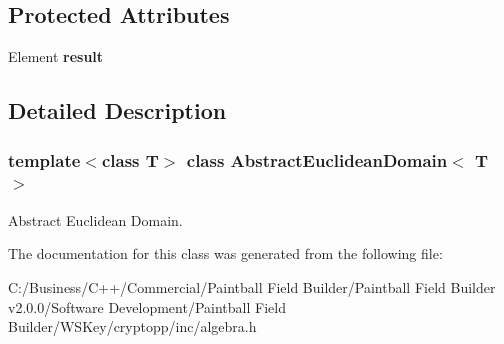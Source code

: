 \subsection*{Protected Attributes}
\begin{DoxyCompactItemize}
\item 
\hypertarget{class_abstract_euclidean_domain_af1314f064e73c560b3d31982c4e26404}{
Element {\bfseries result}}
\label{class_abstract_euclidean_domain_af1314f064e73c560b3d31982c4e26404}

\end{DoxyCompactItemize}


\subsection{Detailed Description}
\subsubsection*{template$<$class T$>$ class AbstractEuclideanDomain$<$ T $>$}

Abstract Euclidean Domain. 

The documentation for this class was generated from the following file:\begin{DoxyCompactItemize}
\item 
C:/Business/C++/Commercial/Paintball Field Builder/Paintball Field Builder v2.0.0/Software Development/Paintball Field Builder/WSKey/cryptopp/inc/algebra.h\end{DoxyCompactItemize}

